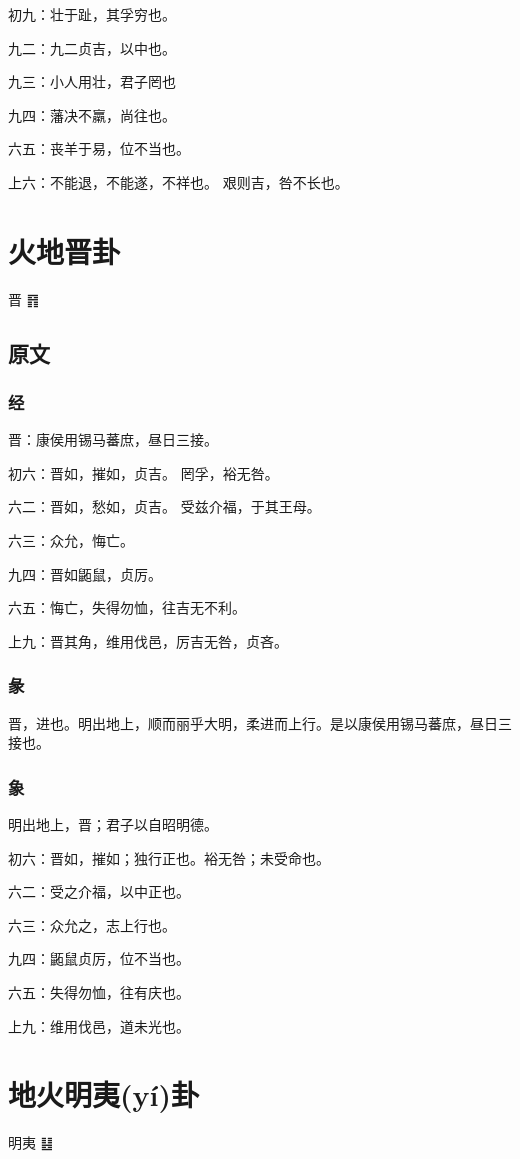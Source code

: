 \documentclass[12pt,oneside]{book}
\begin{document}
初九：壮于趾，其孚穷也。

九二：九二贞吉，以中也。

九三：小人用壮，君子罔也

九四：藩决不羸，尚往也。

六五：丧羊于易，位不当也。

上六：不能退，不能遂，不祥也。 艰则吉，咎不长也。

\chapter{火地晋卦}
晋 {\Large ䷢}

\section{原文}

\subsection{经}
晋：康侯用锡马蕃庶，昼日三接。

初六：晋如，摧如，贞吉。 罔孚，裕无咎。

六二：晋如，愁如，贞吉。 受兹介福，于其王母。

六三：众允，悔亡。

九四：晋如鼫鼠，贞厉。

六五：悔亡，失得勿恤，往吉无不利。

上九：晋其角，维用伐邑，厉吉无咎，贞吝。

\subsection{彖}
晋，进也。明出地上，顺而丽乎大明，柔进而上行。是以康侯用锡马蕃庶，昼日三接也。

\subsection{象}
明出地上，晋；君子以自昭明德。

初六：晋如，摧如；独行正也。裕无咎；未受命也。

六二：受之介福，以中正也。

六三：众允之，志上行也。

九四：鼫鼠贞厉，位不当也。

六五：失得勿恤，往有庆也。

上九：维用伐邑，道未光也。

\chapter{地火明夷(yí)卦}
明夷 {\Large ䷣}
\end{document}
